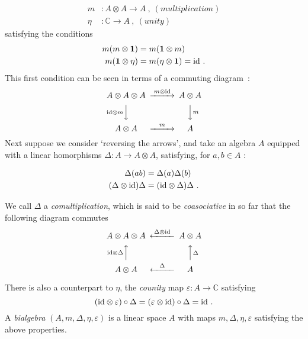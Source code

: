 \documentclass[12pt]{article}
\theoremstyle{plain}
\theoremstyle{definition}
\numberwithin{equation}{section}
\newcommand{\ID}{{\rm id}}
\newcommand{\bC}{\mathbb{C}}
\newcommand{\vep}{\varepsilon}
\newcommand{\lra}{{\longrightarrow}}
\begin{document}
\begin{equation}
\begin{aligned} m &: A \otimes A \lra A~,~(multiplication) \\
\eta &: \bC \lra A~,~ (unity)
\end{aligned}
\end{equation}
satisfying the conditions
\begin{equation}
\begin{aligned}
m(m \otimes \mathbf 1) &= m (\mathbf 1 \otimes m)  \\  m(\mathbf 1
\otimes \eta) &= m (\eta \otimes \mathbf 1) = \ID~.
\end{aligned}
\end{equation}
This first condition can be seen in terms of a commuting diagram~:
\begin{equation}
\begin{CD}
A \otimes A \otimes A @> m \otimes \ID>> A \otimes A
\\ @V \ID \otimes mVV   @VV m V
 \\ A \otimes A  @ > m >> A
\end{CD}
\end{equation}
Next suppose we consider `reversing the arrows', and take an
algebra $A$ equipped with a linear homorphisms $\Delta : A \lra A
\otimes A$, satisfying, for $a,b \in A$ :

\begin{equation}
\begin{aligned} \Delta(ab) &= \Delta(a) \Delta(b)
\\ (\Delta \otimes \ID) \Delta &= (\ID \otimes \Delta) \Delta~.
\end{aligned}
\end{equation}

We call $\Delta$ a \emph{comultiplication}, which is said to be
\emph{coasociative} in so far that the following diagram commutes
\begin{equation}
\begin{CD}
A \otimes A \otimes A @< \Delta\otimes \ID<< A \otimes A
\\ @A \ID \otimes \Delta AA  @AA \Delta A
 \\ A \otimes A  @ < \Delta << A
\end{CD}
\end{equation}

There is also a counterpart to $\eta$, the \emph{counity} map
$\vep : A \lra \bC$ satisfying
\begin{equation}
(\ID \otimes \vep) \circ \Delta = (\vep \otimes \ID) \circ \Delta
= \ID~.
\end{equation}
A \emph{bialgebra} $(A, m, \Delta, \eta,
\vep)$ is a linear space $A$ with maps $m, \Delta, \eta, \vep$
satisfying the above properties.
\end{document}
